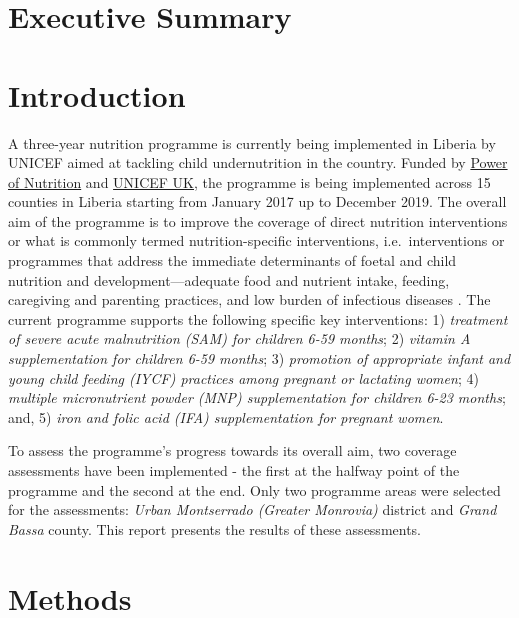 \documentclass[12pt,a4paper]{article}
\begin{document}
\newpage

\hypertarget{executive-summary}{%
\section*{Executive Summary}\label{executive-summary}}

\newpage

\hypertarget{intro}{%
\section{Introduction}\label{intro}}

A three-year nutrition programme is currently being implemented in Liberia by UNICEF aimed at tackling child undernutrition in the country. Funded by \href{http://www.powerofnutrition.org}{Power of Nutrition} and \href{https://www.unicef.org.uk}{UNICEF UK}, the programme is being implemented across 15 counties in Liberia starting from January 2017 up to December 2019. The overall aim of the programme is to improve the coverage of direct nutrition interventions or what is commonly termed nutrition-specific interventions, i.e.~interventions or programmes that address the immediate determinants of foetal and child nutrition and development---adequate food and nutrient intake, feeding, caregiving and parenting practices, and low burden of infectious diseases \citep[\citet{Ruel:2013kr}]{Bhutta:2013ks}. The current programme supports the following specific key interventions: 1) \emph{treatment of severe acute malnutrition (SAM) for children 6-59 months}; 2) \emph{vitamin A supplementation for children 6-59 months}; 3) \emph{promotion of appropriate infant and young child feeding (IYCF) practices among pregnant or lactating women}; 4) \emph{multiple micronutrient powder (MNP) supplementation for children 6-23 months}; and, 5) \emph{iron and folic acid (IFA) supplementation for pregnant women}.

To assess the programme's progress towards its overall aim, two coverage assessments have been implemented - the first at the halfway point of the programme and the second at the end. Only two programme areas were selected for the assessments: \emph{Urban Montserrado (Greater Monrovia)} district and \emph{Grand Bassa} county. This report presents the results of these assessments.

\hypertarget{methods}{%
\section{Methods}\label{methods}}
\end{document}
